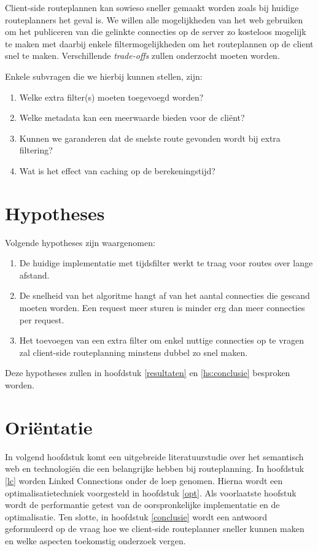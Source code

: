 Client-side routeplannen kan sowieso sneller gemaakt worden zoals bij huidige routeplanners het geval is. We willen alle mogelijkheden van het web gebruiken om het publiceren van die gelinkte connecties op de server zo kosteloos mogelijk te maken met daarbij enkele filtermogelijkheden om het routeplannen op de client snel te maken. Verschillende \textit{trade-offs} zullen onderzocht moeten worden.

Enkele subvragen die we hierbij kunnen stellen, zijn:
\begin{enumerate}
\item Welke extra filter(s) moeten toegevoegd worden?
\item Welke metadata kan een meerwaarde bieden voor de cli\"ent?
\item Kunnen we garanderen dat de snelste route gevonden wordt bij extra filtering?
\item Wat is het effect van caching op de berekeningstijd?
\end{enumerate}

\section{Hypotheses}
\label{hypotheses}
Volgende hypotheses zijn waargenomen:
\begin{enumerate}
\item De huidige implementatie met tijdsfilter werkt te traag voor routes over lange afstand.
\item De snelheid van het algoritme hangt af van het aantal connecties die gescand moeten worden. Een request meer sturen is minder erg dan meer connecties per request.
\item Het toevoegen van een extra filter om enkel nuttige connecties op te vragen zal client-side routeplanning minstens dubbel zo snel maken.
\end{enumerate}

Deze hypotheses zullen in hoofdstuk \ref{resultaten} en \ref{hs:conclusie} besproken worden.

\section{Ori\"entatie}

In volgend hoofdstuk komt een uitgebreide literatuurstudie over het semantisch web en technologi\"en die een belangrijke hebben bij routeplanning. In hoofdstuk \ref{lc} worden Linked Connections onder de loep genomen. Hierna wordt een optimalisatietechniek voorgesteld in hoofdstuk \ref{opt}. Als voorlaatste hoofstuk wordt de performantie getest van de oorspronkelijke implementatie en de optimalisatie. Ten slotte, in hoofdstuk \ref{conclusie} wordt een antwoord geformuleerd op de vraag hoe we client-side routeplanner sneller kunnen maken en welke aspecten toekomstig onderzoek vergen.

